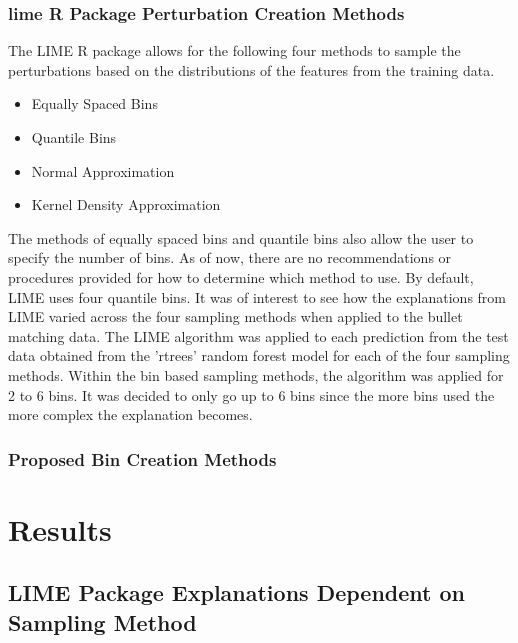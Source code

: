 \documentclass[AMS,STIX1COL]{WileyNJD-v2}
\begin{document}
\subsubsection{lime R Package Perturbation Creation Methods}

The LIME R package allows for the following four methods to sample the perturbations based on the distributions of the features from the training data.

\begin{itemize}
\item Equally Spaced Bins
\item Quantile Bins
\item Normal Approximation
\item Kernel Density Approximation
\end{itemize}

The methods of equally spaced bins and quantile bins also allow the user to specify the number of bins. As of now, there are no recommendations or procedures provided for how to determine which method to use. By default, LIME uses four quantile bins. It was of interest to see how the explanations from LIME varied across the four sampling methods when applied to the bullet matching data. The LIME algorithm was applied to each prediction from the test data obtained from the 'rtrees' random forest model for each of the four sampling methods. Within the bin based sampling methods, the algorithm was applied for 2 to 6 bins. It was decided to only go up to 6 bins since the more bins used the more complex the explanation becomes.

\subsubsection{Proposed Bin Creation Methods}

\section{Results}

\subsection{LIME Package Explanations Dependent on Sampling Method}
\end{document}
